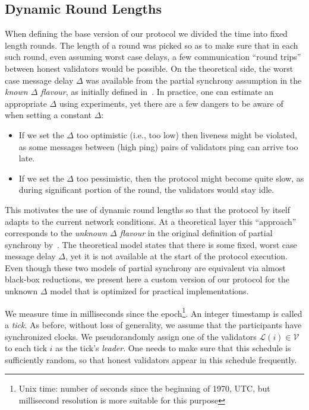 \documentclass[12pt, fleqn]{article}
\begin{document}
\subsection{Dynamic Round Lengths}
When defining the base version of our protocol we divided the time into fixed length rounds.
%
The length of a round was picked so as to make sure that in each such round, even assuming worst case delays, a few communication ``round trips'' between honest validators would be possible.
%
On the theoretical side, the worst case message delay $\Delta$ was available from the partial synchrony assumption in the {\it known $\Delta$ flavour}, as initially defined in~\cite{DLS88}.
%
In practice, one can estimate an appropriate $\Delta$ using experiments, yet there are a few dangers to be aware of when setting a constant $\Delta$:
\begin{itemize}
    \item If we set the $\Delta$ too optimistic (i.e., too low) then liveness might be violated, as some messages between (high ping) pairs of validators ping can arrive too late.
    \item If we set the $\Delta$ too pessimistic, then the protocol might become quite slow, as during significant portion of the round, the validators would stay idle.
\end{itemize}

This motivates the use of dynamic round lengths so that the protocol by itself adapts to the current network conditions.
%
At a theoretical layer this ``approach'' corresponds to the {\it unknown $\Delta$ flavour} in the original definition of partial synchrony by~\cite{DLS88}.
%
The theoretical model states that there is some fixed, worst case message delay $\Delta$, yet it is not available at the start of the protocol execution.
%
Even though these two models of partial synchrony are equivalent via almost black-box reductions, we present here a custom version of our protocol for the unknown $\Delta$ model that is optimized for practical implementations.

We measure time in milliseconds since the epoch\footnote{Unix time: number of seconds since the beginning of 1970, UTC, but millisecond resolution is more suitable for this purpose}.
%
An integer timestamp is called a \emph{tick}.
%
As before, without loss of generality, we assume that the participants have synchronized clocks.
%
We pseudorandomly assign one of the validators $\mathcal{L}(i) \in \mathcal{V}$ to each tick $i$ as the tick's \emph{leader}.
%
One needs to make sure that this schedule is sufficiently random, so that honest validators appear in this schedule frequently.
%
\end{document}
